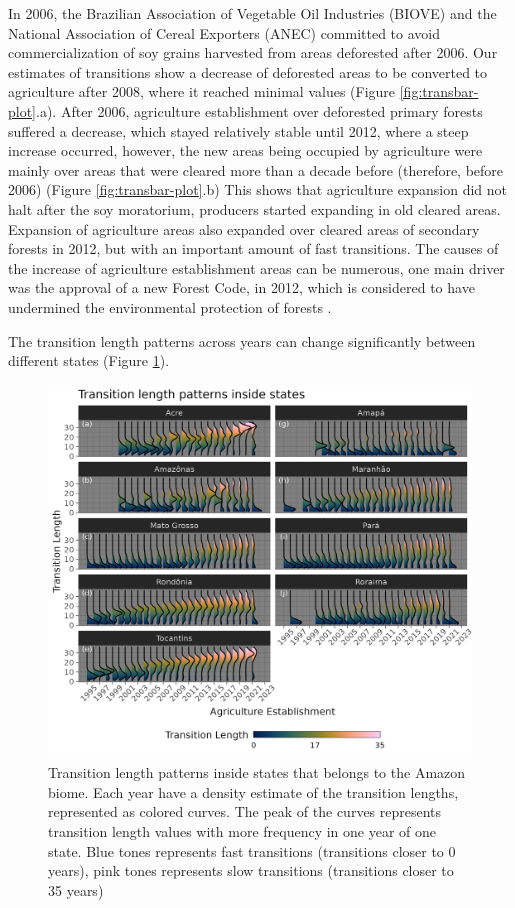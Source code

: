 \documentclass[essd, manuscript]{copernicus}
\begin{document}
In 2006, the Brazilian Association of Vegetable Oil Industries (BIOVE) and the National Association of Cereal Exporters (ANEC) committed to avoid commercialization of soy grains harvested from areas deforested after 2006.
Our estimates of transitions show a decrease of deforested areas to be converted to agriculture after 2008, where it reached minimal values (Figure \ref{fig:transbar-plot}.a).
After 2006, agriculture establishment over deforested primary forests suffered a decrease, which stayed relatively stable until 2012, where a steep increase occurred, however, the new areas being occupied by agriculture were mainly over areas that were cleared more than a decade before (therefore, before 2006) (Figure \ref{fig:transbar-plot}.b) This shows that agriculture expansion did not halt after the soy moratorium, producers started expanding in old cleared areas.
Expansion of agriculture areas also expanded over cleared areas of secondary forests in 2012, but with an important amount of fast transitions.
The causes of the increase of agriculture establishment areas can be numerous, one main driver was the approval of a new Forest Code, in 2012, which is considered to have undermined the environmental protection of forests \citep{Kroger2017, Pereira2019}.

The transition length patterns across years can change significantly between different states (Figure \ref{fig:transridge-plot}).

\begin{figure}[ht]
\includegraphics[width=17cm]{figs/trans_ridge} \caption{Transition length patterns inside states that belongs to the Amazon biome. Each year have a density estimate of the transition lengths, represented as colored curves. The peak of the curves represents transition length values with more frequency in one year of one state. Blue tones represents fast transitions (transitions closer to 0 years), pink tones represents slow transitions (transitions closer to 35 years)}\label{fig:transridge-plot}
\end{figure}
\end{document}
